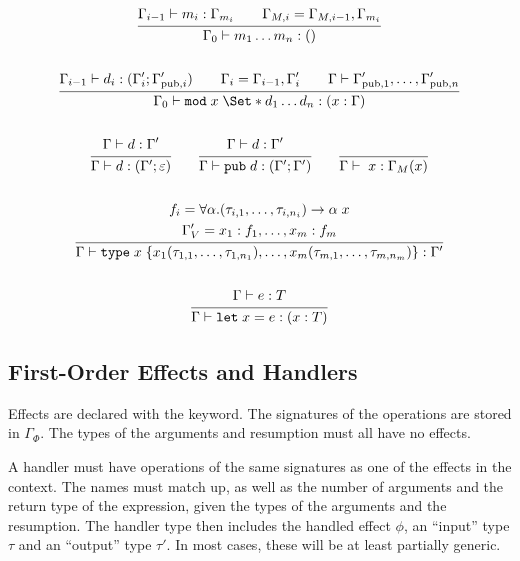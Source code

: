 \begin{gather*}
    \infer{
        \Gamma_0 \vdash m_1\dots m_n: ()
    }{
        \Gamma_{i-1} \vdash m_i: \Gamma_{m_i}
        \qquad
        \Gamma_{M,i} = \Gamma_{M,i-1}, \Gamma_{m_i}
    }
    \\\\
    \infer{
        \Gamma_0 \vdash \kw{mod}\;x\;\S{ d_1 \dots d_n }: (x: \Gamma)
    }{
        \Gamma_{i-1} \vdash d_i : (\Gamma'_i; \Gamma'_{\text{pub}, i})
        \qquad
        \Gamma_i = \Gamma_{i-1}, \Gamma'_i
        \qquad
        \Gamma \vdash \Gamma'_{\text{pub},1}, \dots, \Gamma'_{\text{pub},n}
    }
    \\\\
    \infer{
        \Gamma \vdash d : (\Gamma'; \varepsilon)
    }{
        \Gamma \vdash d : \Gamma'
    }
    \qquad
    \infer{
        \Gamma \vdash \kw{pub}\;d : (\Gamma'; \Gamma')
    }{
        \Gamma \vdash d : \Gamma'
    }
    \qquad
    \infer{
        \Gamma \vdash \;x : \Gamma_M(x)
    }{}
    \\\\
    \infer{
        \Gamma \vdash \type\;x \;
        \{ x_1(\tau_{1,1}, \dots, \tau_{1,n_1}), \dots, x_m(\tau_{m,1}, \dots, \tau_{m,n_m}) \} : \Gamma'
    }{
        f_i = \forall \alpha. (\tau_{i,1}, \dots, \tau_{i,n_i}) \to \alpha\;x
        \\
        \Gamma'_V = x_1: f_1,\dots,x_m: f_m
    }
    \\\\
    \infer{
        \Gamma \vdash \kw{let}\;x = e : (x: T)
    }{
        \Gamma \vdash e : T
    }
\end{gather*}

\subsection{First-Order Effects and Handlers}
Effects are declared with the  keyword. The signatures of the operations are stored in $\Gamma_\Phi$. The types of the arguments and resumption must all have no effects.

A handler must have operations of the same signatures as one of the effects in the context. The names must match up, as well as the number of arguments and the return type of the expression, given the types of the arguments and the resumption. The handler type then includes the handled effect $\phi$, an ``input'' type $\tau$ and an ``output'' type $\tau'$. In most cases, these will be at least partially generic.

